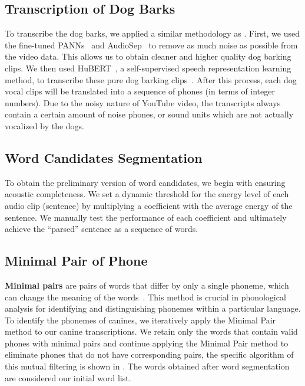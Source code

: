 \subsection{Transcription of Dog Barks}

To transcribe the dog barks, we applied a similar methodology as 
\citet{huang2023transcribing}.  First, we used the fine-tuned PANNs~\citep{kong2020panns} 
and AudioSep~\citep{liu2023separate} to remove as much noise as possible from the video data. This allows us to obtain cleaner and higher quality dog barking clips.
We then used HuBERT~\citep{hsu2021hubert}, a self-supervised speech representation learning method, to transcribe these pure dog barking clips~\cite{li2024phonetic}.
After this process, each dog vocal clips will be translated into a sequence of phones
(in terms of integer numbers). Due to the noisy nature of YouTube video, the transcripts
always contain a certain amount of noise phones, or sound units which are not actually vocalized by the dogs.

\subsection{Word Candidates Segmentation}

To obtain the preliminary version of word candidates, we begin with ensuring acoustic completeness. We set a dynamic threshold for the energy level of each audio clip (sentence) by multiplying a coefficient with the average energy of the sentence. We manually test the performance of each coefficient and ultimately achieve the ``parsed'' sentence as a sequence of words.

\subsection{Minimal Pair of Phone}

\textbf{Minimal pairs} are pairs of words that differ by only a single phoneme, which can change the meaning of the words~\citep{ladefoged2006course}. This method is crucial in phonological analysis for identifying and distinguishing phonemes within a particular language. To identify the phonemes of canines, we iteratively apply the Minimal Pair method to our canine transcriptions. We retain only the words that contain valid phones with minimal pairs and continue applying the Minimal Pair method to eliminate phones that do not have corresponding pairs, the specific algorithm of this mutual filtering is shown in . The words obtained after word segmentation are considered our initial word list. 

